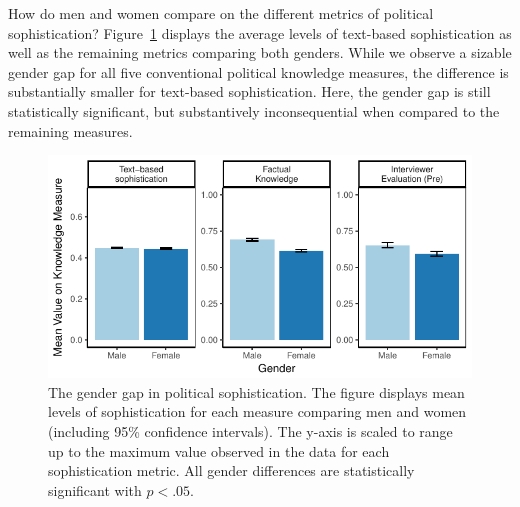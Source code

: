 \documentclass[12pt]{article}
\begin{document}

How do men and women compare on the different metrics of political sophistication? Figure~\ref{fig:meandiff} displays the average levels of text-based sophistication as well as the remaining metrics comparing both genders. While we observe a sizable gender gap for all five conventional political knowledge measures, the difference is substantially smaller for text-based sophistication. Here, the gender gap is still statistically significant, but substantively inconsequential when compared to the remaining measures.

\begin{figure}[h]\centering
\includegraphics{../fig/meandiff_pres.pdf}
\caption{The gender gap in political sophistication. The figure displays mean levels of sophistication for each measure comparing men and women (including 95\% confidence intervals). The y-axis is scaled to range up to the maximum value observed in the data for each sophistication metric. All gender differences are statistically significant with $p<.05$.}\label{fig:meandiff}
\end{figure}
\end{document}
